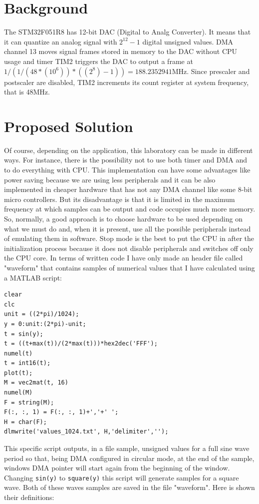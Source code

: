 \documentclass[peerreview]{IEEEtran}
\begin{document}
\section{Background}
The STM32F051R8 has 12-bit DAC (Digital to Analg Converter). It means that it can quantize an analog signal with $2^{12}-1$ digital unsigned values. DMA channel 13 moves signal frames stored in memory to the DAC without CPU usage and timer TIM2 triggers the DAC to output a frame at $1/(1/(48*(10^{6}))*((2^{8})-1)) = 188.2352941$MHz. Since prescaler and postscaler are disabled, TIM2 increments its count register at system frequency, that is 48MHz.
\section{Proposed Solution}
Of course, depending on the application, this laboratory can be made in different ways. For instance, there is the possibility not to use both timer and DMA and to do everything with CPU. This implementation can have some advantages like power saving because we are using less peripherals and it can be also implemented in cheaper hardware that has not any DMA channel like some 8-bit micro controllers. But its disadvantage is that it is limited in the maximum frequency at which samples can be output and code occupies much more memory. So, normally, a good approach is to choose hardware to be used depending on what we must do and, when it is present, use all the possible peripherals instead of emulating them in software.
Stop mode is the best to put the CPU in after the initialization process because it does not disable peripherals and switches off only the CPU core.
In terms of written code I have only made an header file called "waveform" that contains samples of numerical values that I have calculated  using a MATLAB script:
\begin{lstlisting}[style=Matlab]
clear
clc
unit = ((2*pi)/1024);
y = 0:unit:(2*pi)-unit;
t = sin(y);
t = ((t+max(t))/(2*max(t)))*hex2dec('FFF');
numel(t)
t = int16(t);
plot(t);
M = vec2mat(t, 16)
numel(M)
F = string(M);
F(:, :, 1) = F(:, :, 1)+','+' ';
H = char(F);
dlmwrite('values_1024.txt', H,'delimiter','');
\end{lstlisting}
This specific script outputs, in a file sample, unsigned values for a full sine wave period so that, being DMA configured in circular mode, at the end of the sample, windows DMA pointer will start again from the beginning of the window. Changing \lstinline[style=Matlab]{sin(y)} to \lstinline[style=Matlab]{square(y)} this script will generate samples for a square wave. Both of these waves samples are saved in the file  "waveform". Here is shown their definitions:
\end{document}
